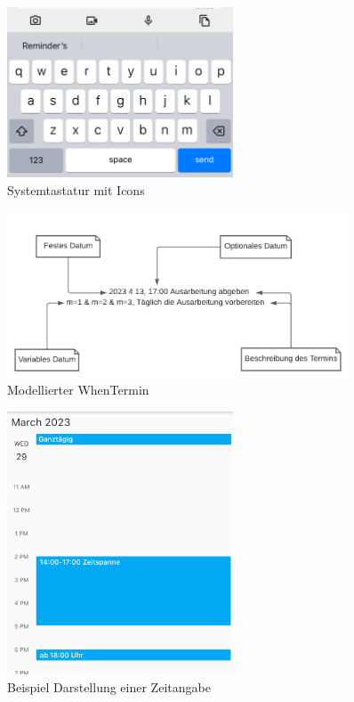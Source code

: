 \begin{figure}
    \centering
    \includegraphics[width=0.6\textwidth]{res/tastatur.png} 
    \caption{Systemtastatur mit Icons} 
    \label{pic:tastatur}
\end{figure}

\begin{figure}
    \centering
    \includegraphics[width=0.9\textwidth]{res/when_termin.png} 
    \caption{Modellierter WhenTermin} 
    \label{pic:when_termin}
\end{figure}

\begin{figure}
    \centering
    \includegraphics[width=0.6\textwidth]{res/zeitspanne.png} 
    \caption{Beispiel Darstellung einer Zeitangabe} 
    \label{pic:zeitspanne}
\end{figure}

